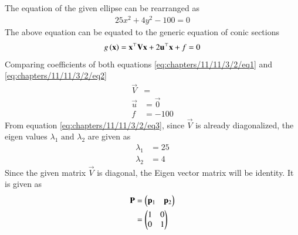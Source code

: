 The equation of the given ellipse can be rearranged as 
\begin{align}
	\label{eq:chapters/11/11/3/2/eq1}
	25x^2+4y^2-100=0
\end{align}
The above equation can be equated to the generic equation of conic sections
\begin{align}
	\label{eq:chapters/11/11/3/2/eq2}
	g\left(\mathbf{x}\right)=\mathbf{x}^\top \mathbf{V} \mathbf{x} + 2\mathbf{u}^\top \mathbf{x} + f = 0
\end{align}
Comparing coefficients of both equations \eqref{eq:chapters/11/11/3/2/eq1} and \eqref{eq:chapters/11/11/3/2/eq2}
\begin{align}
	\label{eq:chapters/11/11/3/2/eq3}
	\vec{V} &= \\
	\vec{u} &= \vec{0}\\
	f &= -100
\end{align}
From equation \eqref{eq:chapters/11/11/3/2/eq3}, since $\vec{V}$ is already diagonalized, the eigen values $\lambda_1 \text{ and } \lambda_2$ are given as
\begin{align}
	\lambda_1 &= 25\\
	\lambda_2 &= 4
\end{align}
Since the given matrix $\vec{V}$ is diagonal, the Eigen vector matrix will be identity. It is given as
\begin{align}
	\mathbf{P} &= \begin{pmatrix}\mathbf{p}_1 & \mathbf{p}_2\end{pmatrix}\\
		&= \begin{pmatrix}1&0\\0&1\end{pmatrix}
\end{align}
